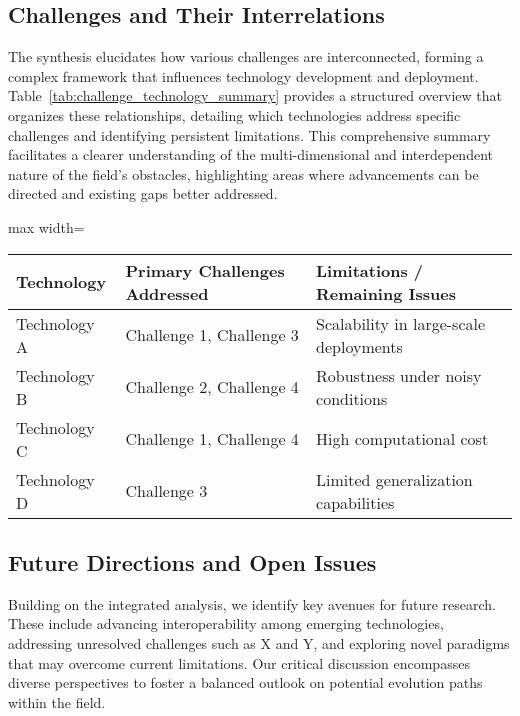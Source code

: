 \documentclass[sigconf]{acmart}
\begin{document}
\subsection{Challenges and Their Interrelations}
The synthesis elucidates how various challenges are interconnected, forming a complex framework that influences technology development and deployment. Table~\ref{tab:challenge_technology_summary} provides a structured overview that organizes these relationships, detailing which technologies address specific challenges and identifying persistent limitations. This comprehensive summary facilitates a clearer understanding of the multi-dimensional and interdependent nature of the field's obstacles, highlighting areas where advancements can be directed and existing gaps better addressed.

\begin{table*}[htbp]
\centering
\caption{Summary of Key Technologies, Challenges, and Their Interrelations}
\label{tab:challenge_technology_summary}
\begin{adjustbox}{max width=\textwidth}
\begin{tabular}{@{}lll@{}}
\toprule
\textbf{Technology} & \textbf{Primary Challenges Addressed} & \textbf{Limitations / Remaining Issues} \\ \midrule
Technology A & Challenge 1, Challenge 3 & Scalability in large-scale deployments \\
Technology B & Challenge 2, Challenge 4 & Robustness under noisy conditions \\
Technology C & Challenge 1, Challenge 4 & High computational cost \\
Technology D & Challenge 3 & Limited generalization capabilities \\ \bottomrule
\end{tabular}
\end{adjustbox}
\end{table*}

\subsection{Future Directions and Open Issues}
Building on the integrated analysis, we identify key avenues for future research. These include advancing interoperability among emerging technologies, addressing unresolved challenges such as X and Y, and exploring novel paradigms that may overcome current limitations. Our critical discussion encompasses diverse perspectives to foster a balanced outlook on potential evolution paths within the field.
\end{document}
